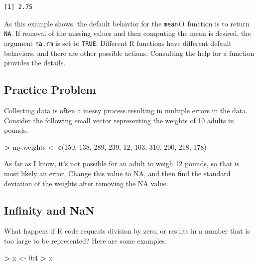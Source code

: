 \documentclass[]{krantz}
\makeatletter
\newenvironment{Shaded}{\begin{snugshade}}{\end{snugshade}}
\newcommand{\KeywordTok}[1]{\textcolor[rgb]{0.27,0.27,0.27}{\textbf{#1}}}
\newcommand{\DecValTok}[1]{\textcolor[rgb]{0.06,0.06,0.06}{#1}}
\newcommand{\StringTok}[1]{\textcolor[rgb]{0.5,0.5,0.5}{#1}}
\newcommand{\OperatorTok}[1]{\textcolor[rgb]{0.43,0.43,0.43}{\textbf{#1}}}
\newcommand{\NormalTok}[1]{#1}
\newenvironment{kframe}{%
\medskip{}
\setlength{\fboxsep}{.8em}
 \def\at@end@of@kframe{}%
 \ifinner\ifhmode%
  \def\at@end@of@kframe{\end{minipage}}%
  \begin{minipage}{\columnwidth}%
 \fi\fi%
 \def\FrameCommand##1{\hskip\@totalleftmargin \hskip-\fboxsep
 \colorbox{shadecolor}{##1}\hskip-\fboxsep
     \hskip-\linewidth \hskip-\@totalleftmargin \hskip\columnwidth}%
 \MakeFramed {\advance\hsize-\width
   \@totalleftmargin\z@ \linewidth\hsize
   \@setminipage}}%
 {\par\unskip\endMakeFramed%
 \at@end@of@kframe}
\renewenvironment{Shaded}{\begin{kframe}}{\end{kframe}}
\makeatother
\begin{document}
\begin{verbatim}
[1] 2.75
\end{verbatim}

As this example shows, the default behavior for the \texttt{mean()}
function is to return \texttt{NA}. If removal of the missing values and
then computing the mean is desired, the argument \texttt{na.rm} is set
to \texttt{TRUE}. Different R functions have different default
behaviors, and there are other possible actions. Consulting the help for
a function provides the details.

\subsection{Practice Problem}\label{practice-problem-2}

Collecting data is often a messy process resulting in multiple errors in
the data. Consider the following small vector representing the weights
of 10 adults in pounds.

\begin{Shaded}
\begin{Highlighting}[]
\OperatorTok{>}\StringTok{ }\NormalTok{my.weights <-}\StringTok{ }\KeywordTok{c}\NormalTok{(}\DecValTok{150}\NormalTok{, }\DecValTok{138}\NormalTok{, }\DecValTok{289}\NormalTok{, }\DecValTok{239}\NormalTok{, }\DecValTok{12}\NormalTok{, }\DecValTok{103}\NormalTok{, }\DecValTok{310}\NormalTok{, }\DecValTok{200}\NormalTok{, }\DecValTok{218}\NormalTok{, }\DecValTok{178}\NormalTok{)}
\end{Highlighting}
\end{Shaded}

As far as I know, it's not possible for an adult to weigh 12 pounds, so
that is most likely an error. Change this value to NA, and then find the
standard deviation of the weights after removing the NA value.

\subsection{Infinity and NaN}\label{infinity-and-nan}

What happens if R code requests division by zero, or results in a number
that is too large to be represented? Here are some examples.

\begin{Shaded}
\begin{Highlighting}[]
\OperatorTok{>}\StringTok{ }\NormalTok{x <-}\StringTok{ }\DecValTok{0}\OperatorTok{:}\DecValTok{4}
\OperatorTok{>}\StringTok{ }\NormalTok{x}
\end{Highlighting}
\end{Shaded}
\end{document}
